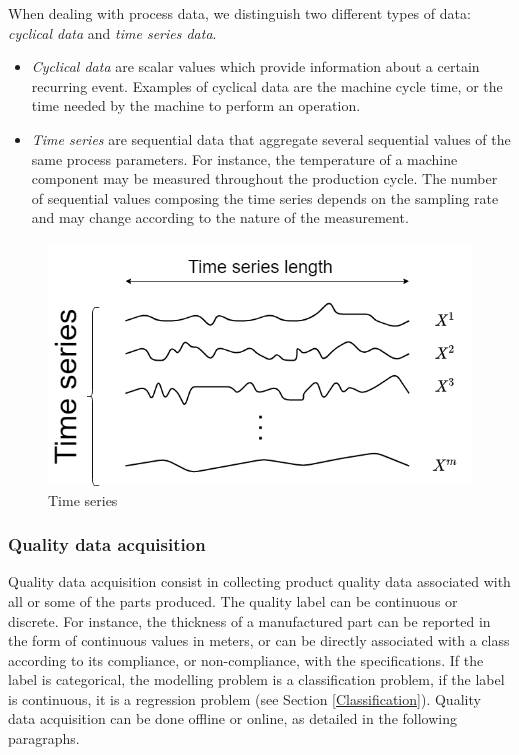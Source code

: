 When dealing with process data, we distinguish two different types of data: \textit{cyclical data} and \textit{time series data}.

\begin{itemize}
    \item \textit{Cyclical data} are scalar values which provide information about a certain recurring event. Examples of cyclical data are the machine cycle time, or the time needed by the machine to perform an operation. 
    \item \textit{Time series} are sequential data that aggregate several sequential values of the same process parameters. For instance, the temperature of a machine component may be measured throughout the production cycle. The number of sequential values composing the time series depends on the sampling rate and may change according to the nature of the measurement.
\end{itemize}

\begin{figure}
\centering
\includegraphics[scale=0.5]{images/chapter_3/time_series_data.png}
\caption{Time series}
\label{fig:time_series_data}
\end{figure}


\subsubsection{Quality data acquisition}

Quality data acquisition consist in collecting product quality data associated with all or some of the parts produced. The quality label can be continuous or discrete. For instance, the thickness of a manufactured part can be reported in the form of continuous values in meters, or can be directly associated with a class according to its compliance, or non-compliance, with the specifications. If the label is categorical, the  modelling problem is a classification problem, if the label is continuous,  it is a regression problem (see Section \ref{Classification}). Quality data acquisition can be done offline or online, as detailed in the following paragraphs. 

